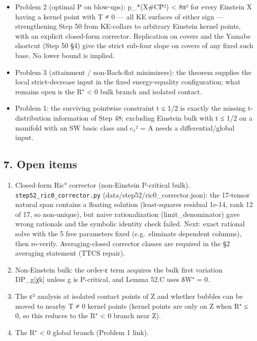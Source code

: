 \documentclass[
  10pt,
]{report}
\providecommand{\tightlist}{%
  \setlength{\itemsep}{0pt}\setlength{\parskip}{0pt}}
\begin{document}
\begin{itemize}
\tightlist
\item
  Problem 2 (optimal P on blow-ups): p\_*(X\#CP̄²) \textless{} 8π² for
  every Einstein X having a kernel point with T ≠ 0 --- all KE surfaces
  of either sign --- strengthening Step 50 from KE-collars to arbitrary
  Einstein kernel points, with an explicit closed-form corrector.
  Replication on covers and the Yamabe shortcut (Step 50 §4) give the
  strict sub-four slope on covers of any fixed such base. No lower bound
  is implied.
\item
  Problem 3 (attainment / non-Bach-flat minimizers): the theorem
  supplies the local strict-decrease input in the fixed energy-equality
  configuration; what remains open is the R⁺ \textless{} 0 bulk branch
  and isolated contact.
\item
  Problem 1: the surviving pointwise constraint t ≤ 1/2 is exactly the
  missing t-distribution information of Step 48; excluding Einstein bulk
  with t ≤ 1/2 on a manifold with an SW basic class and c₁² = A needs a
  differential/global input.
\end{itemize}

\hypertarget{open-items}{%
\subsection{7. Open items}\label{open-items}}

\begin{enumerate}
\def\labelenumi{\arabic{enumi}.}
\tightlist
\item
  Closed-form Ric° corrector (non-Einstein P-critical bulk).
  \texttt{step52\_ric0\_corrector.py}
  (data/step52/ric0\_corrector.json): the 17-tensor natural span
  contains a floating solution (least-squares residual 1e-14, rank 12 of
  17, so non-unique), but naive rationalization (limit\_denominator)
  gave wrong rationals and the symbolic identity check failed. Next:
  exact rational solve with the 5 free parameters fixed (e.g.~eliminate
  dependent columns), then re-verify. Averaging-closed corrector classes
  are required in the §2 averaging statement (TTCS repair).
\item
  Non-Einstein bulk: the order-ε term acquires the bulk first variation
  DP\_g{[}χk{]} unless g is P-critical, and Lemma 52.C uses δW⁺ = 0.
\item
  The ε² analysis at isolated contact points of Z and whether bubbles
  can be moved to nearby T ≠ 0 kernel points (kernel points are only on
  Z when R⁺ ≤ 0, so this reduces to the R⁺ \textless{} 0 branch near Z).
\item
  The R⁺ \textless{} 0 global branch (Problem 1 link).
\end{enumerate}
\end{document}
